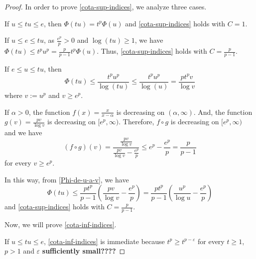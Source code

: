 \documentclass[twoside]{article}
\theoremstyle{remark}
\renewcommand{\leq}{\leqslant}
\begin{document}
\begin{proof}
In order to prove \eqref{cota-sup-indices}, we analyze three cases.

If $u\leq tu\leq e$, then $\Phi(tu)=t^p\Phi(u)$ and \eqref{cota-sup-indices} holds with $C=1$.

If $u\leq e\leq tu$, as $\frac{e^p}{p}>0$  and $\log(tu)\geq 1$, we have 
$\Phi(tu)\leq t^pu^p= \frac{p}{p-1}t^p\Phi(u)$. Thus, \eqref{cota-sup-indices} holds with $C=\frac{p}{p-1}$.

If $e\leq u\leq tu$, then 
\begin{equation}\label{Phi-de-u-a-v}
\Phi(tu)\leq \frac{t^pu^p}{\log(tu)}\leq \frac{t^pu^p}{\log(u)}=\frac{pt^pv}{\log v}
\end{equation} where $v:=u^p$ and $v\geq e^p$.

If $\alpha>0$, the function $f(x)=\frac{x}{x-\alpha}$ is decreasing on $(\alpha,\infty)$.
And, the function $g(v)=\frac{pv}{\log v}$ is decreasing  on $[e^p,\infty)$. 
Therefore, $f \circ g$ is decreasing on $[e^p,\infty)$ and we have 
\[
(f\circ g)(v)=
\frac{\frac{pv}{\log v}}{\frac{pv}{\log v}-\frac{e^p}{p}}\leq 
e^p-\frac{e^p}{p}=\frac{p}{p-1}
\]
for every $v \geq e^p$.

In this way, from \eqref{Phi-de-u-a-v}, we have
\[
\Phi(tu)\leq \frac{pt^p}{p-1}\left(\frac{pv}{\log v}-\frac{e^p}{p}\right)=
 \frac{pt^p}{p-1}\left(\frac{u^p}{\log u}-\frac{e^p}{p}\right)
\]
and \eqref{cota-sup-indices} holds with $C=\frac{p}{p-1}$.

Now, we will prove \eqref{cota-inf-indices}.

If $u\leq tu \leq e$, \eqref{cota-inf-indices} is immediate because $t^p \geq t^{p-\varepsilon}$ for every $t \geq 1$, $p>1$ and $\varepsilon$ {\bf sufficiently small????}


\end{proof}
\end{document}
